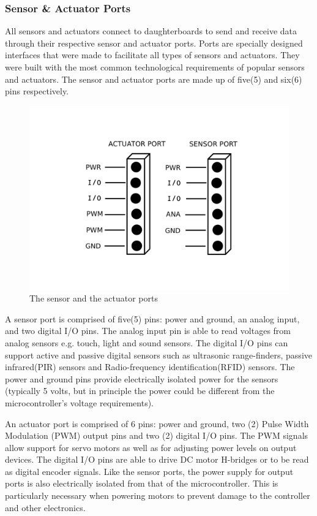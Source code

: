 	\subsubsection{Sensor \& Actuator Ports} %
	\label{ssub:input_&_output_ports}
	All sensors and actuators connect to daughterboards to send and receive data through their respective sensor and actuator ports. Ports are specially designed interfaces that were made to facilitate all types of sensors and actuators. They were built with the most common technological requirements of popular sensors and actuators. The sensor and actuator ports are made up of five(5) and six(6) pins respectively.

\begin{figure}[h]
  \begin{center}
    \includegraphics[width=0.5\columnwidth]{Figures/Ports.pdf}
    \caption{The sensor and the actuator ports}
  \end{center}
\end{figure}

 A sensor port is comprised of five(5) pins: power and ground, an analog input, and two digital I/O pins. The analog input pin is able to read voltages from analog sensors e.g. touch, light and sound sensors. The digital I/O pins can support active and passive digital sensors such as ultrasonic range-finders,  passive infrared(PIR) sensors and Radio-frequency identification(RFID) sensors. The power and ground pins provide electrically isolated power for the sensors (typically 5 volts, but in principle the power could be different from the microcontroller's voltage requirements).

An actuator port is comprised of 6 pins: power and ground, two (2) Pulse Width Modulation (PWM) output pins and two (2) digital I/O pins. The PWM signals allow support for servo motors as well as for adjusting power levels on output devices. The digital I/O pins are able to drive DC motor H-bridges or to be read as digital encoder signals. Like the sensor ports, the power supply for output ports is also electrically isolated from that of the microcontroller. This is particularly necessary when powering motors to prevent damage to the controller and other electronics.

